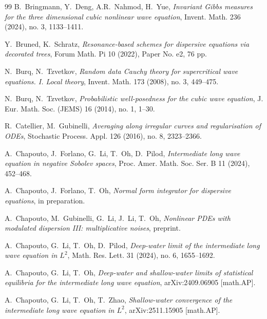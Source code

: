 \documentclass[letterpaper, 11pt,  reqno]{amsart}
\newcommand{\1}{\hspace{0.5mm}\text{I}\hspace{0.5mm}}
\numberwithin{equation}{section}
\numberwithin{theorem}{section}
\begin{document}
\begin{thebibliography}{99}
B.~Bringmann, Y.~Deng, A.R.~Nahmod, H.~Yue, 
{\it Invariant Gibbs measures for the three dimensional cubic nonlinear wave equation},
 Invent. Math. 236 (2024), no. 3, 1133--1411. 


Y.~Bruned, K.~Schratz, 
{\it Resonance-based schemes for dispersive equations via decorated trees},
 Forum Math. Pi 10 (2022), Paper No. e2, 76 pp.





N.~Burq, N.~Tzvetkov, 
{\it Random data Cauchy theory for supercritical wave equations. I. Local theory},
 Invent. Math. 173 (2008), no. 3, 449--475. 


N.~Burq, N.~Tzvetkov, 
{\it Probabilistic well-posedness for the cubic wave equation},
 J. Eur. Math. Soc. (JEMS) 16 (2014), no. 1, 1--30. 
 
 





R.~Catellier, M.~Gubinelli, 
{\it Averaging along irregular curves and regularisation of ODEs}, 
Stochastic Process. Appl. 126 (2016), no. 8, 2323--2366. 






A.~Chapouto, J.~Forlano, G.~Li, T.~Oh, D.~Pilod,
{\it  Intermediate long wave equation in negative Sobolev spaces},
 Proc. Amer. Math. Soc. Ser. B 11 (2024), 452--468.


A.~Chapouto, J.~Forlano, T.~Oh, 
{\it  Normal form integrator for dispersive equations}, %
in preparation.


A.~Chapouto, M.~Gubinelli, G.~Li, J.~Li, T.~Oh, 
{\it Nonlinear PDEs with modulated dispersion III: multiplicative noises}, 
preprint.


A.~Chapouto, G.~Li, T.~Oh, D.~Pilod,
{\it Deep-water limit of the intermediate long wave equation in $L^2$},
Math. Res. Lett.
 31 (2024), no. 6, 1655--1692. 



A.~Chapouto, G.~Li, T.~Oh, 
{\it
Deep-water and shallow-water limits
of statistical equilibria
for the intermediate long wave equation}, 
arXiv:2409.06905 [math.AP].


A.~Chapouto, G.~Li, T.~Oh, T.~Zhao, 
{\it
Shallow-water convergence of the intermediate long wave equation in $L^2$}, 
arXiv:2511.15905 [math.AP].




\end{thebibliography}
\end{document}
